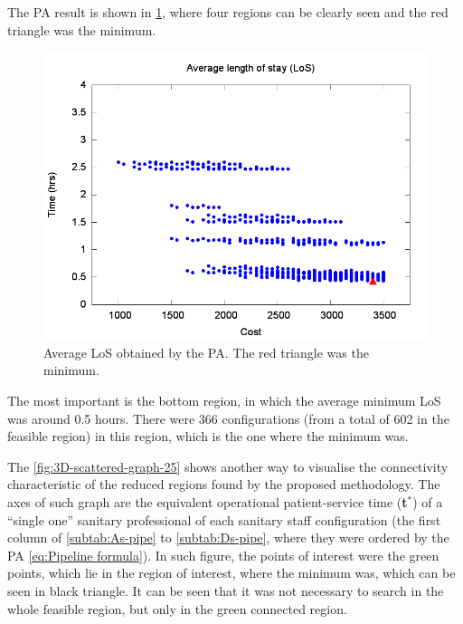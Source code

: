 \documentclass[11pt]{article} %
\begin{document}
The PA result is shown in \ref{subfig:pipe4-1}, where four regions
can be clearly seen and the red triangle was the minimum. 
\begin{figure}[H]
\noindent \begin{centering}
\includegraphics[width=0.95\columnwidth,height=0.23\paperheight]{figs4/v0/6400-602-25-pipe-LoS-min}
\par\end{centering}

\caption{Average LoS obtained by the PA. The red triangle was the minimum.
\label{subfig:pipe4-1}}
\end{figure}
The most important is the bottom region, in which the average minimum
LoS was around 0.5 hours. There were 366 configurations (from a total
of 602 in the feasible region) in this region, which is the one where
the minimum was.

The \ref{fig:3D-scattered-graph-25} shows another way to visualise
the connectivity characteristic of the reduced regions found by the
proposed methodology. The axes of such graph are the equivalent operational
patient-service time ({\bf t$^*$}) of a ``single
one'' sanitary professional of each sanitary staff configuration
(the first column of \ref{subtab:As-pipe} to \ref{subtab:Ds-pipe},
where they were ordered by the PA \ref{eq:Pipeline formula}). In
such figure, the points of interest were the green points, which lie
in the region of interest, where the minimum was, which can be seen
in black triangle. It can be seen that it was not necessary to search
in the whole feasible region, but only in the green connected region. 
\end{document}
